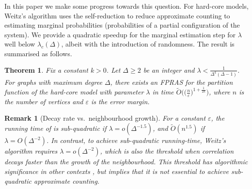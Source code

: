 \documentclass[10pt,a4paper]{article}
\newtheorem{theorem}{Theorem}[section]
\newtheorem{remark}{Remark}[section]
\newcommand{\eps}{\varepsilon}
\begin{document}
In this paper we make some progress towards this question.
For hard-core models, Weitz's algorithm uses the self-reduction \cite{JVV86} to reduce approximate counting to estimating marginal probabilities (probabilities of a partial configuration of the system).
We provide a quadratic speedup for the marginal estimation step for $\lambda$ well below $\lambda_c(\Delta)$, albeit with the introduction of randomness.
The result is summarised as follows.

\begin{theorem}
\label{small-lambda}
Fix a constant $k>0$. 
Let $\Delta\ge 2$ be an integer and $\lambda<\frac{1}{\Delta^k(\Delta-1)}$. 
For graphs with maximum degree $\Delta$, there exists an FPRAS for the partition function of the hard-core model with parameter $\lambda$ in time $\widetilde{O}\big( \big( \frac{n}{\eps} \big)^{1+\frac{1}{2k}} \big)$, 
where $n$ is the number of vertices and $\eps$ is the error margin. 
\end{theorem}

\begin{remark}[Decay rate vs.~neighbourhood growth]
For a constant $\eps$,
the running time of  is sub-quadratic if $\lambda=o(\Delta^{-1.5})$,
and $\widetilde{O}(n^{1.5})$ if $\lambda=O(\Delta^{-2})$. 
In contrast, to achieve sub-quadratic running-time, Weitz's algorithm requires $\lambda=o(\Delta^{-2})$,
which is also the threshold when correlation decays faster than the growth of the neighbourhood.
This threshold has algorithmic significance in other contexts \cite{FGY22,AJ22},
but  implies that it is not essential to achieve sub-quadratic approximate counting.
\end{remark}
\end{document}
